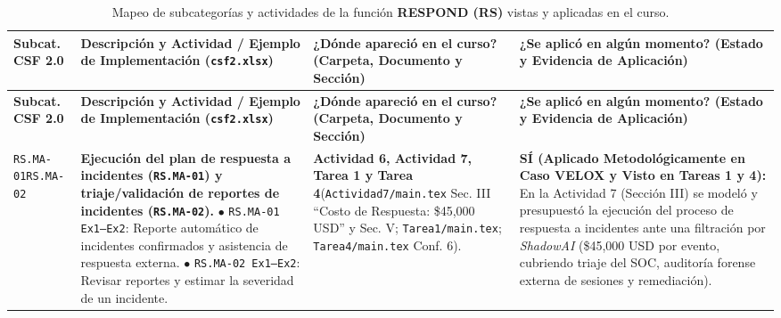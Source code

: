 \documentclass[letterpaper,11pt]{article}
\begin{document}
\begingroup
\scriptsize
\setlength{\tabcolsep}{3.5pt}
\renewcommand{\arraystretch}{1.24}
\begin{longtable}{|C{1.5cm}|L{5.3cm}|L{4.3cm}|L{5.8cm}|}
\caption{Mapeo de subcategorías y actividades de la función \textbf{RESPOND (RS)} vistas y aplicadas en el curso.}
\label{tab:mapeo-rs} \\
\hline
{}
\textbf{Subcat. CSF 2.0} & \textbf{Descripción y Actividad / Ejemplo de Implementación (\texttt{csf2.xlsx})} & \textbf{¿Dónde apareció en el curso? (Carpeta, Documento y Sección)} & \textbf{¿Se aplicó en algún momento? (Estado y Evidencia de Aplicación)} \\
\hline
\endfirsthead
\hline
{}
\textbf{Subcat. CSF 2.0} & \textbf{Descripción y Actividad / Ejemplo de Implementación (\texttt{csf2.xlsx})} & \textbf{¿Dónde apareció en el curso? (Carpeta, Documento y Sección)} & \textbf{¿Se aplicó en algún momento? (Estado y Evidencia de Aplicación)} \\
\hline
\endhead
\hline
\endfoot

\texttt{RS.MA-01}\newline \texttt{RS.MA-02} &
\textbf{Ejecución del plan de respuesta a incidentes (\texttt{RS.MA-01}) y triaje/validación de reportes de incidentes (\texttt{RS.MA-02}).}\newline
$\bullet$ \texttt{RS.MA-01 Ex1--Ex2}: Reporte automático de incidentes confirmados y asistencia de respuesta externa.\newline
$\bullet$ \texttt{RS.MA-02 Ex1--Ex2}: Revisar reportes y estimar la severidad de un incidente. &
\textbf{Actividad 6, Actividad 7, Tarea 1 y Tarea 4}\newline (\texttt{Actividad7/main.tex} Sec. III ``Costo de Respuesta: \$45,000 USD'' y Sec. V; \texttt{Tarea1/main.tex}; \texttt{Tarea4/main.tex} Conf. 6). &
\textbf{SÍ (Aplicado Metodológicamente en Caso VELOX y Visto en Tareas 1 y 4):}\newline
En la Actividad 7 (Sección III) se modeló y presupuestó la ejecución del proceso de respuesta a incidentes ante una filtración por \textit{ShadowAI} (\$45,000 USD por evento, cubriendo triaje del SOC, auditoría forense externa de sesiones y remediación). \\
\hline


\end{longtable}
\end{document}
